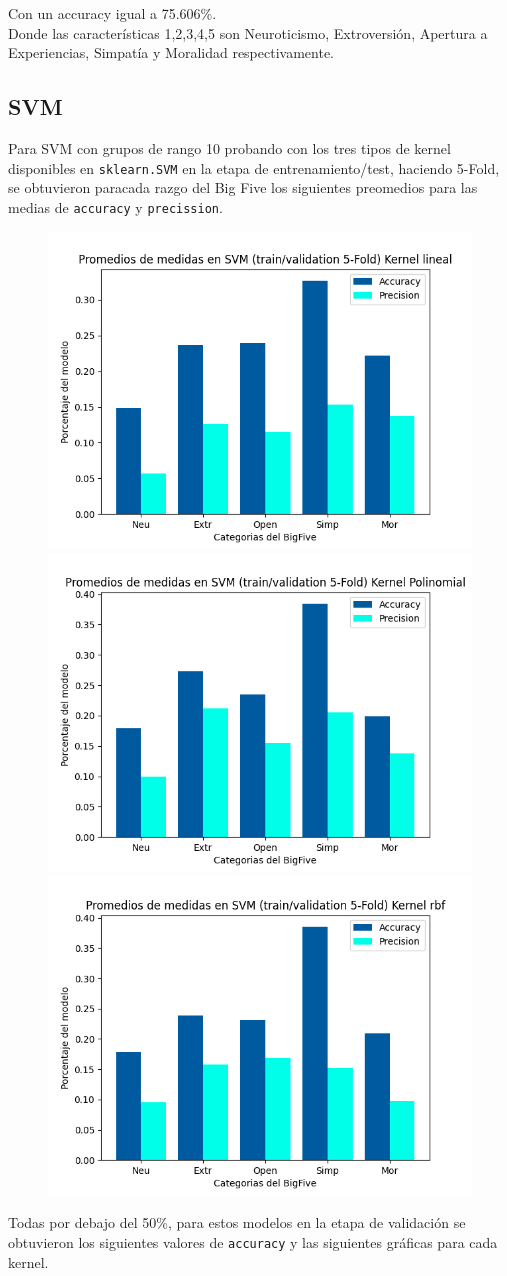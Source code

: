 \documentclass[10pt, a4paper]{article}
\begin{document}
                Con un accuracy igual a 75.606\%.\\
                
                Donde las caracter\'isticas 1,2,3,4,5 son Neuroticismo, Extroversi\'on, Apertura a Experiencias, 
                Simpat\'ia y Moralidad respectivamente.
            
            \subsection{SVM} 
            Para SVM con grupos de rango 10 probando con los tres tipos de kernel disponibles en \texttt{sklearn.SVM} en la etapa de 
            entrenamiento/test, haciendo 5-Fold, se obtuvieron paracada razgo del Big Five los siguientes preomedios para las medias de
            \texttt{accuracy} y \texttt{precission}.

            \begin{figure}[h!]
                \centering
                \includegraphics[width = 0.3\linewidth]{Medias_Lineal10.png}
                \includegraphics[width = 0.3\linewidth]{Medias_Polinomial10.png}
                \includegraphics[width = 0.3\linewidth]{Medias_rbf10.png}

            \end{figure}

            Todas por debajo del 50\%, para estos modelos en la etapa de validaci\'on se obtuvieron los 
            siguientes valores de \texttt{accuracy} y las siguientes gr\'aficas para cada kernel. \\ 
\end{document}
